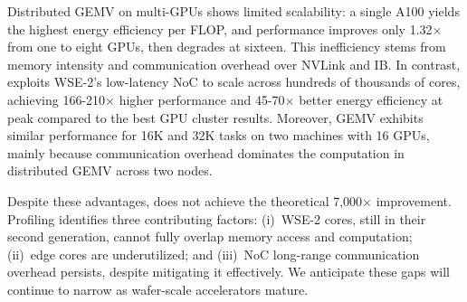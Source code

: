 Distributed GEMV on multi-GPUs shows limited scalability: a single A100 yields the highest energy efficiency per FLOP, and performance improves only 1.32$\times$ from one to eight GPUs, then degrades at sixteen. This inefficiency stems from memory intensity and communication overhead over NVLink and IB. In contrast, \gemv exploits WSE-2's low-latency NoC to scale across hundreds of thousands of cores, achieving 166-210$\times$ higher performance and 45-70$\times$ better energy efficiency at peak compared to the best GPU cluster results. Moreover, GEMV exhibits similar performance for 16K and 32K tasks on two machines with 16 GPUs, mainly because communication overhead dominates the computation in distributed GEMV across two nodes.

Despite these advantages, \gemv does not achieve the theoretical 7,000$\times$ improvement. Profiling identifies three contributing factors: (i)~WSE-2 cores, still in their second generation, cannot fully overlap memory access and computation; (ii)~edge cores are underutilized; and (iii)~NoC long-range communication overhead persists, despite \gemv mitigating it effectively. We anticipate these gaps will continue to narrow as wafer-scale accelerators mature.

\begin{table}[t]
  \centering
  \caption{Comparing \sys(WSE-2) with SGLang(A100) in prefill throughput and energy.}
  \vspace{-0.3cm}
  \label{tab:llmoc_gpu_prefill}%
\end{table}%

